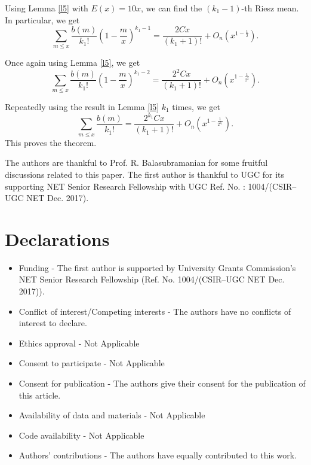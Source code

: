 \documentclass[sn-mathphys,Numbered]{sn-jnl}
\theoremstyle{thmstyleone}%
\theoremstyle{thmstyletwo}%
\theoremstyle{thmstylethree}%
\begin{document}
Using Lemma \ref{l5} with $E(x) = 10x$, we can find the $(k_1-1)$-th Riesz mean. In particular, we get
$$ \sum_{m \leq x} \frac{b(m)}{k_1!} \left( 1-\frac{m}{x} \right)^{k_1-1} = \frac{2Cx}{(k_1+1)!} + O_{n} (x^{1-\frac{1}{2}} ) . $$


Once again using Lemma \ref{l5}, we get
$$ \sum_{m \leq x} \frac{b(m)}{k_1!} \left( 1-\frac{m}{x} \right)^{k_1-2} = \frac{2^2Cx}{(k_1+1)!} + O_{n} (x^{1-\frac{1}{2^2}}  ) . $$

Repeatedly using the result in Lemma \ref{l5} $k_1$ times, we get
$$ \sum_{m \leq x} \frac{b(m)}{k_1!} = \frac{2^{k_1}Cx}{(k_1+1)!} + O_n \left( x^{1-\frac{1}{2^{k_1}}}  \right) . $$
This proves the theorem. \\

\backmatter


The authors are thankful to Prof. R. Balasubramanian for some fruitful discussions related to this paper. The first author is thankful to UGC for its supporting NET Senior Research Fellowship with UGC Ref. No. : 1004/(CSIR--UGC NET Dec. 2017). \\

\section*{Declarations}

\begin{itemize}
\item Funding - The first author is supported by University Grants Commission’s NET Senior Research Fellowship (Ref. No. 1004/(CSIR–UGC NET Dec. 2017)).
\item Conflict of interest/Competing interests - The authors have no conflicts of interest to declare.
\item Ethics approval - Not Applicable
\item Consent to participate - Not Applicable
\item Consent for publication - The authors give their consent for the publication of this article.
\item Availability of data and materials - Not Applicable
\item Code availability - Not Applicable
\item Authors' contributions - The authors have equally contributed to this work. \\
\end{itemize}


%
\end{document}
